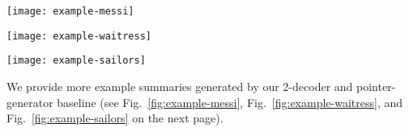 \documentclass[11pt,a4paper]{article}
\def\figref#1{Fig.~\ref{#1}}
\begin{document}
\begin{figure*}[t]
\centering
\texttt{[image: example-messi]}
\vspace{-10pt} 
\caption{The pointer-generator repeats itself (italic) and makes a factual error (red), while the 2-decoder (pointer-generator + closed-book decoder) generates the summary that recovers the salient information (highlighted) in the original text.}
\label{fig:example-messi}
\end{figure*}

\begin{figure*}[t]
\centering
\texttt{[image: example-waitress]}
\vspace{-10pt} 
\caption{The pointer-generator fails to address the most salient information from the original text, only mentioned a few unimportant points (where the waitress works), while the 2-decoder (pointer-generator + closed-book decoder) generates the summary that recovers the salient information (highlighted) in the original text.}
\label{fig:example-waitress}
\end{figure*}

\begin{figure*}[t]
\centering
\texttt{[image: example-sailors]}
\vspace{-10pt} 
\caption{The pointer-generator (non-coverage) repeats itself (italic), while the 2-decoder (pointer-generator + closed-book decoder) generates the summary that recovers the salient information (highlighted) in the original text as well as the reference summary.}
\label{fig:example-sailors}
\end{figure*}

We provide more example summaries generated by our 2-decoder and pointer-generator baseline (see \figref{fig:example-messi}, \figref{fig:example-waitress}, and \figref{fig:example-sailors} on the next page).
\clearpage{}
\end{document}
